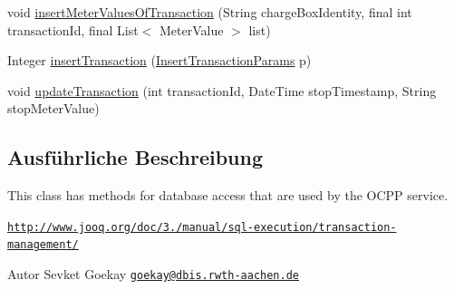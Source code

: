 \begin{DoxyCompactItemize}
\item 
void \hyperlink{classde_1_1rwth_1_1idsg_1_1steve_1_1repository_1_1impl_1_1_ocpp_server_repository_impl_a1f019ba19371134836f429d50f8e3531}{insert\+Meter\+Values\+Of\+Transaction} (String charge\+Box\+Identity, final int transaction\+Id, final List$<$ Meter\+Value $>$ list)
\item 
Integer \hyperlink{classde_1_1rwth_1_1idsg_1_1steve_1_1repository_1_1impl_1_1_ocpp_server_repository_impl_aee738d89085b14d44096000d52625f83}{insert\+Transaction} (\hyperlink{classde_1_1rwth_1_1idsg_1_1steve_1_1repository_1_1dto_1_1_insert_transaction_params}{Insert\+Transaction\+Params} p)
\item 
void \hyperlink{classde_1_1rwth_1_1idsg_1_1steve_1_1repository_1_1impl_1_1_ocpp_server_repository_impl_a09d464e362b67cc329474a42fe7339e4}{update\+Transaction} (int transaction\+Id, Date\+Time stop\+Timestamp, String stop\+Meter\+Value)
\end{DoxyCompactItemize}


\subsection{Ausführliche Beschreibung}
This class has methods for database access that are used by the O\+C\+P\+P service.

\href{http://www.jooq.org/doc/3.4/manual/sql-execution/transaction-management/}{\tt http\+://www.\+jooq.\+org/doc/3./manual/sql-\/execution/transaction-\/management/}

\begin{DoxyAuthor}{Autor}
Sevket Goekay \href{mailto:goekay@dbis.rwth-aachen.de}{\tt goekay@dbis.\+rwth-\/aachen.\+de} 
\end{DoxyAuthor}


